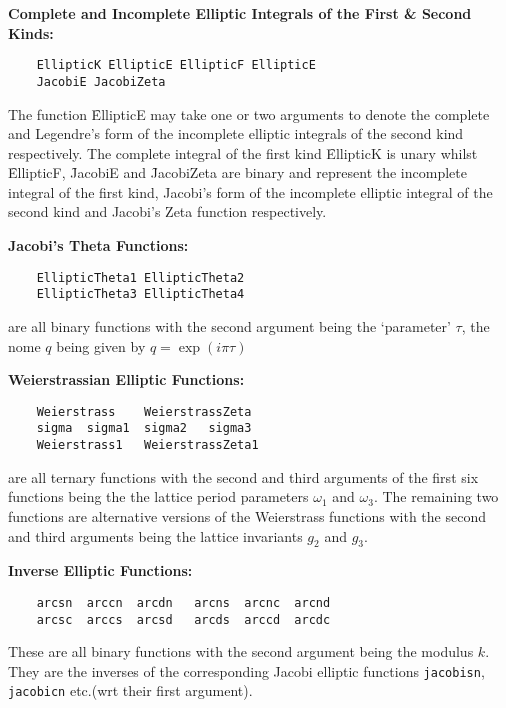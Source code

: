 \textbf{Complete and Incomplete Elliptic Integrals of the First \& Second Kinds:}
\begin{verbatim}
    EllipticK EllipticE EllipticF EllipticE
    JacobiE JacobiZeta
\end{verbatim}
The function \f{EllipticE} may take one or two arguments to
denote the complete and Legendre's form of the incomplete elliptic integrals of
the second kind respectively. The complete integral of the first kind
\f{EllipticK} is unary whilst \f{EllipticF}, \f{JacobiE} and
\f{JacobiZeta} are binary and represent the incomplete integral of
the first kind, Jacobi's form of the incomplete elliptic integral of
the second kind and Jacobi's Zeta function respectively.

\textbf{Jacobi's Theta Functions:}
\begin{verbatim}
    EllipticTheta1 EllipticTheta2
    EllipticTheta3 EllipticTheta4
\end{verbatim}
are all binary functions with the second argument being the `parameter' $\tau$,
the nome $q$ being given by $q = \exp(i\pi\tau)$

\textbf{Weierstrassian Elliptic Functions:}
\begin{verbatim}
    Weierstrass    WeierstrassZeta
    sigma  sigma1  sigma2   sigma3
    Weierstrass1   WeierstrassZeta1
\end{verbatim}
are all ternary functions with the second and third arguments of the first
six functions being the the lattice period parameters $\omega_1$ and $\omega_3$.
The remaining two functions are alternative versions of the Weierstrass
functions with the second and third arguments being the lattice invariants
$g_2$ and $g_3$.

\textbf{Inverse Elliptic Functions:}
\begin{verbatim}
    arcsn  arccn  arcdn   arcns  arcnc  arcnd
    arcsc  arccs  arcsd   arcds  arccd  arcdc
\end{verbatim}
These are all binary functions with the second argument being the modulus $k$.
They are the inverses of the corresponding Jacobi elliptic functions
\texttt{jacobisn}, \texttt{jacobicn} etc.\/(wrt their first argument).

